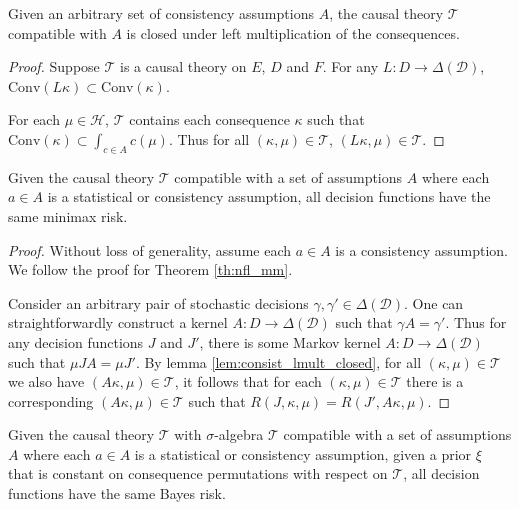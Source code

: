 \begin{lemma}\label{lem:consist_lmult_closed}
Given an arbitrary set of consistency assumptions $A$, the causal theory $\mathscr{T}$ compatible with $A$ is closed under left multiplication of the consequences.
\end{lemma}

\begin{proof}
Suppose $\mathscr{T}$ is a causal theory on $E$, $D$ and $F$. For any $L:D\to \Delta(\mathcal{D})$, $\mathrm{Conv}(L\kappa) \subset \mathrm{Conv}(\kappa)$.

For each $\mu\in \mathscr{H}$, $\mathscr{T}$ contains each consequence $\kappa$ such that $\mathrm{Conv}(\kappa)\subset \int_{c\in A}c(\mu)$. Thus for all $(\kappa,\mu)\in \mathscr{T}$, $(L\kappa,\mu)\in \mathscr{T}$.
\end{proof}

\begin{theorem}\label{th:no_in_out_min}
Given the causal theory $\mathscr{T}$ compatible with a set of assumptions $A$ where each $a\in A$ is a statistical or consistency assumption, all decision functions have the same minimax risk.
\end{theorem}

\begin{proof}
Without loss of generality, assume each $a\in A$ is a consistency assumption. We follow the proof for Theorem \ref{th:nfl_mm}.

Consider an arbitrary pair of stochastic decisions $\gamma,\gamma'\in \Delta(\mathcal{D})$. One can straightforwardly construct a kernel $A:D\to \Delta(\mathcal{D})$ such that $\gamma A = \gamma'$. Thus for any decision functions $J$ and $J'$, there is some Markov kernel $A:D\to \Delta(\mathcal{D})$ such that $\mu J A = \mu J'$. By lemma \ref{lem:consist_lmult_closed}, for all $(\kappa,\mu)\in \mathscr{T}$ we also have $(A\kappa,\mu)\in \mathscr{T}$, it follows that for each $(\kappa,\mu)\in \mathscr{T}$ there is a corresponding $(A\kappa,\mu)\in \mathscr{T}$ such that $R(J,\kappa,\mu)=R(J',A\kappa,\mu)$.
\end{proof}


\begin{theorem}\label{th:no_in_out_bayes}
Given the causal theory $\mathscr{T}$ with $\sigma$-algebra $\mathcal{T}$ compatible with a set of assumptions $A$ where each $a\in A$ is a statistical or consistency assumption, given a prior $\xi$ that is constant on consequence permutations with respect on $\mathscr{T}$, all decision functions have the same Bayes risk.
\end{theorem}

